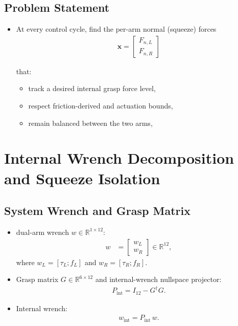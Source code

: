 \documentclass[conference]{IEEEtran}
\begin{document}
\subsection{Problem Statement}
\begin{itemize}
    \item At every control cycle, find the per-arm normal (squeeze) forces
    \begin{align}
                \mathbf{x} = \begin{bmatrix}
            F_{n,L} \\
            F_{n,R}
        \end{bmatrix}
    \end{align}

    that:
    \begin{itemize}
        \item track a desired internal grasp force level,
        \item respect friction-derived and actuation bounds,
        \item remain balanced between the two arms,
    \end{itemize}
\end{itemize}

\section{Internal Wrench Decomposition and Squeeze Isolation}

\subsection*{System Wrench and Grasp Matrix}
\begin{itemize}
    \item dual-arm wrench $w\in \mathbb{R}^{1\times12}$:
    \begin{align}
        w &=
        \begin{bmatrix}
            w_L \\
            w_R
        \end{bmatrix}
        \in \mathbb{R}^{12},
    \end{align}
    where \(w_L = [\tau_L; f_L]\) and \(w_R = [\tau_R; f_R]\).

    \item Grasp matrix \(G \in \mathbb{R}^{6 \times 12}\) and internal-wrench nullspace projector:
    \begin{align}
        P_{\mathrm{int}} = I_{12} - G^\dagger G.
    \end{align}

    \item Internal wrench:
    \begin{align}
        w_{\mathrm{int}} = P_{\mathrm{int}}\, w.
    \end{align}
\end{itemize}
\end{document}
